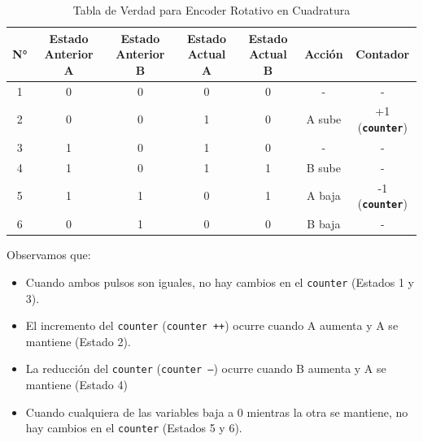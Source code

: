                     \begin{table}[H]
                        \centering
                        \begin{tabular}{|c|c|c|c|c|c|c|}
                            \hline
                             N° & Estado Anterior A & Estado Anterior B & Estado Actual A & Estado Actual B & Acción & Contador\\
                             \hline
                             1 & 0 & 0 & 0 & 0 & - & -\\
                             \hline
                             2 & 0 & 0 & 1 & 0 & A sube & +1 (\texttt{\textbf{counter}})\\
                             \hline
                             3 & 1 & 0 & 1 & 0 & - & -\\
                             \hline
                             4 & 1 & 0 & 1 & 1 & B sube & -\\
                             \hline
                             5 & 1 & 1 & 0 & 1 & A baja & -1 (\texttt{\textbf{counter}})\\
                             \hline
                             6 & 0 & 1 & 0 & 0 & B baja & -\\
                             \hline
                        \end{tabular}
                        \caption{Tabla de Verdad para Encoder Rotativo en Cuadratura}
                        \label{tab:s1}
                        \end{table}
                        
                        Observamos que:\par
                        \begin{itemize} [label=•]
                            \setlength{\itemindent}{1.5em}
                            
                            \item Cuando ambos pulsos son iguales, no hay cambios en el \texttt{counter} (Estados 1 y 3).
                            \item El incremento del \texttt{counter} (\texttt{counter ++}) ocurre cuando A aumenta y A se mantiene (Estado 2).
                            \item La reducción del \texttt{counter} (\texttt{counter --}) ocurre cuando B aumenta y A se mantiene (Estado 4)
                            \item  Cuando cualquiera de las variables baja a 0 mientras la otra se mantiene, no hay cambios en el \texttt{counter} (Estados 5 y 6).
                        \end{itemize}
                        
